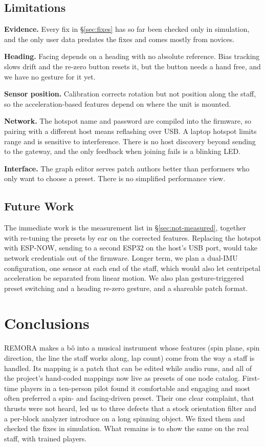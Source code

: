 \documentclass[sigconf,nonacm]{acmart}
\begin{document}
\subsection{Limitations}
\label{sec:limitations}
\textbf{Evidence.} Every fix in \S\ref{sec:fixes} has so far been checked only in simulation, and the
only user data predates the fixes and comes mostly from novices.

\textbf{Heading.} Facing depends on a heading with no absolute reference. Bias tracking slows drift
and the re-zero button resets it, but the button needs a hand free, and we have no gesture for it
yet.

\textbf{Sensor position.} Calibration corrects rotation but not position along the staff, so the
acceleration-based features depend on where the unit is mounted.

\textbf{Network.} The hotspot name and password are compiled into the firmware, so pairing with a
different host means reflashing over USB. A laptop hotspot limits range and is sensitive to
interference. There is no host discovery beyond sending to the gateway, and the only feedback when
joining fails is a blinking LED.

\textbf{Interface.} The graph editor serves patch authors better than performers who only want to
choose a preset. There is no simplified performance view.

\subsection{Future Work}
\label{sec:future}
The immediate work is the measurement list in \S\ref{sec:not-measured}, together with re-tuning the
presets by ear on the corrected features. Replacing the hotspot with ESP-NOW, sending to a second
ESP32 on the host's USB port, would take network credentials out of the firmware. Longer term, we
plan a dual-IMU configuration, one sensor at each end of the staff, which would also let centripetal
acceleration be separated from linear motion. We also plan gesture-triggered preset switching and a
heading re-zero gesture, and a shareable patch format.

\section{Conclusions}
REMORA makes a b\^o into a musical instrument whose features (spin plane, spin direction, the line
the staff works along, lap count) come from the way a staff is handled. Its mapping is a patch that
can be edited while audio runs, and all of the project's hand-coded mappings now live as presets of
one node catalog. First-time players in a ten-person pilot found it comfortable and engaging and
most often preferred a spin- and facing-driven preset. Their one clear complaint, that thrusts were
not heard, led us to three defects that a stock orientation filter and a per-block analyzer
introduce on a long spinning object. We fixed them and checked the fixes in simulation. What remains
is to show the same on the real staff, with trained players.
\end{document}
